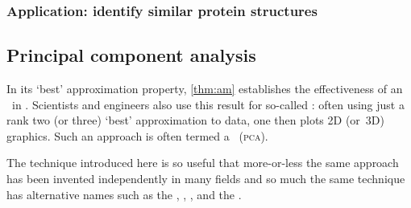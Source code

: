




\begin{draft}
\subsubsection {Application: identify similar protein structures}
\label{sec:aicps}

\begin{comment}
As an exercise or an application could introduce the Kabsch algorithm (Wikipedia) for calculating the optimal rotation matrix that minimizes the root mean squared deviation between two paired sets of points.  It is useful in graphics, cheminformatics to compare molecular structures, and also bioinformatics for comparing protein structures.
\end{comment}

\end{draft}




\subsection{Principal component analysis}
\label{sec:pca}


In its `best' approximation property, \autoref{thm:am} establishes the effectiveness of an \svd\ in .
Scientists and engineers also use this result for so-called : often using just a rank two (or three) `best' 
approximation to  data, one then plots 2D (or~3D) graphics.
Such an approach is often termed a ~(\textsc{pca}).

The technique introduced here is so useful that more-or-less the same 
approach has been invented independently in many fields and so much 
the same technique has alternative names such as the 
, , , and the .


\begin{comment}
 \cite[\S8.4]{Chartier2015}
\end{comment}




